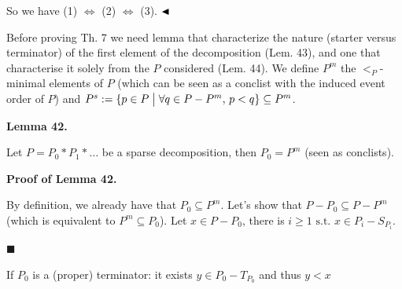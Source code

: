  
  
So we have (1) $\Leftrightarrow$ (2) $\Leftrightarrow$ (3). $\hfill\blacktriangleleft$\par
 
 
 
Before proving Th. 7 we need lemma that characterize the nature (starter versus terminator) of the first element of the decomposition (Lem. 43), and one that characterise it solely from the $P$ considered (Lem. 44). We define $P^{m}$ the $<_{P}$-minimal elements of $P$ (which can be seen as a conclist with the induced event order of $P$) and $P^{s}:={\{p\in P\mathrel{\big{|}}\forall q\in P-P^{m},\,p<q\}}\subseteq P^{m}$.\par
 
 
 
\par\medskip\noindent\textbf{Lemma 42.}\par
 
 
Let $P=P_{0}*P_{1}*\dots$ be a sparse decomposition, then $P_{0}=P^{m}$ (seen as conclists).\par
 
 
 
 
 
\par\medskip\noindent\textbf{Proof of Lemma 42.}\par
 
 
By definition, we already have that $P_{0}\subseteq P^{m}$. Let’s show that $P-P_{0}\subseteq P-P^{m}$ (which is equivalent to $P^{m}\subseteq P_{0}$). Let $x\in P-P_{0}$, there is $i\geqslant 1\text{ s.t.\ }x\in P_{i}-S_{P_{i}}$.\par
  
\par\noindent  $\blacksquare$ 
 
If $P_{0}$ is a (proper) terminator: it exists $y\in P_{0}-T_{P_{0}}$ and thus $y<x$\par
 
 

